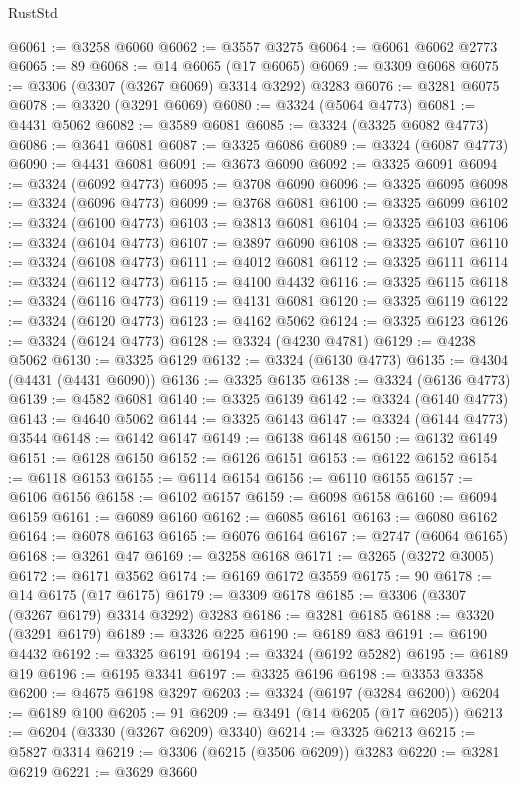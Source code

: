 \begin{lexlean}{RustStd}
\begin{coremodule}
@6061 := @3258 @6060
@6062 := @3557 @3275
@6064 := @6061 @6062 @2773
@6065 := 89
@6068 := @14 @6065 (@17 @6065)
@6069 := @3309 @6068
@6075 := @3306 (@3307 (@3267 @6069) @3314 @3292) @3283
@6076 := @3281 @6075
@6078 := @3320 (@3291 @6069)
@6080 := @3324 (@5064 @4773)
@6081 := @4431 @5062
@6082 := @3589 @6081
@6085 := @3324 (@3325 @6082 @4773)
@6086 := @3641 @6081
@6087 := @3325 @6086
@6089 := @3324 (@6087 @4773)
@6090 := @4431 @6081
@6091 := @3673 @6090
@6092 := @3325 @6091
@6094 := @3324 (@6092 @4773)
@6095 := @3708 @6090
@6096 := @3325 @6095
@6098 := @3324 (@6096 @4773)
@6099 := @3768 @6081
@6100 := @3325 @6099
@6102 := @3324 (@6100 @4773)
@6103 := @3813 @6081
@6104 := @3325 @6103
@6106 := @3324 (@6104 @4773)
@6107 := @3897 @6090
@6108 := @3325 @6107
@6110 := @3324 (@6108 @4773)
@6111 := @4012 @6081
@6112 := @3325 @6111
@6114 := @3324 (@6112 @4773)
@6115 := @4100 @4432
@6116 := @3325 @6115
@6118 := @3324 (@6116 @4773)
@6119 := @4131 @6081
@6120 := @3325 @6119
@6122 := @3324 (@6120 @4773)
@6123 := @4162 @5062
@6124 := @3325 @6123
@6126 := @3324 (@6124 @4773)
@6128 := @3324 (@4230 @4781)
@6129 := @4238 @5062
@6130 := @3325 @6129
@6132 := @3324 (@6130 @4773)
@6135 := @4304 (@4431 (@4431 @6090))
@6136 := @3325 @6135
@6138 := @3324 (@6136 @4773)
@6139 := @4582 @6081
@6140 := @3325 @6139
@6142 := @3324 (@6140 @4773)
@6143 := @4640 @5062
@6144 := @3325 @6143
@6147 := @3324 (@6144 @4773) @3544
@6148 := @6142 @6147
@6149 := @6138 @6148
@6150 := @6132 @6149
@6151 := @6128 @6150
@6152 := @6126 @6151
@6153 := @6122 @6152
@6154 := @6118 @6153
@6155 := @6114 @6154
@6156 := @6110 @6155
@6157 := @6106 @6156
@6158 := @6102 @6157
@6159 := @6098 @6158
@6160 := @6094 @6159
@6161 := @6089 @6160
@6162 := @6085 @6161
@6163 := @6080 @6162
@6164 := @6078 @6163
@6165 := @6076 @6164
@6167 := @2747 (@6064 @6165)
@6168 := @3261 @47
@6169 := @3258 @6168
@6171 := @3265 (@3272 @3005)
@6172 := @6171 @3562
@6174 := @6169 @6172 @3559
@6175 := 90
@6178 := @14 @6175 (@17 @6175)
@6179 := @3309 @6178
@6185 := @3306 (@3307 (@3267 @6179) @3314 @3292) @3283
@6186 := @3281 @6185
@6188 := @3320 (@3291 @6179)
@6189 := @3326 @225
@6190 := @6189 @83
@6191 := @6190 @4432
@6192 := @3325 @6191
@6194 := @3324 (@6192 @5282)
@6195 := @6189 @19
@6196 := @6195 @3341
@6197 := @3325 @6196
@6198 := @3353 @3358
@6200 := @4675 @6198 @3297
@6203 := @3324 (@6197 (@3284 @6200))
@6204 := @6189 @100
@6205 := 91
@6209 := @3491 (@14 @6205 (@17 @6205))
@6213 := @6204 (@3330 (@3267 @6209) @3340)
@6214 := @3325 @6213
@6215 := @5827 @3314
@6219 := @3306 (@6215 (@3506 @6209)) @3283
@6220 := @3281 @6219
@6221 := @3629 @3660

\end{coremodule}
\end{lexlean}
